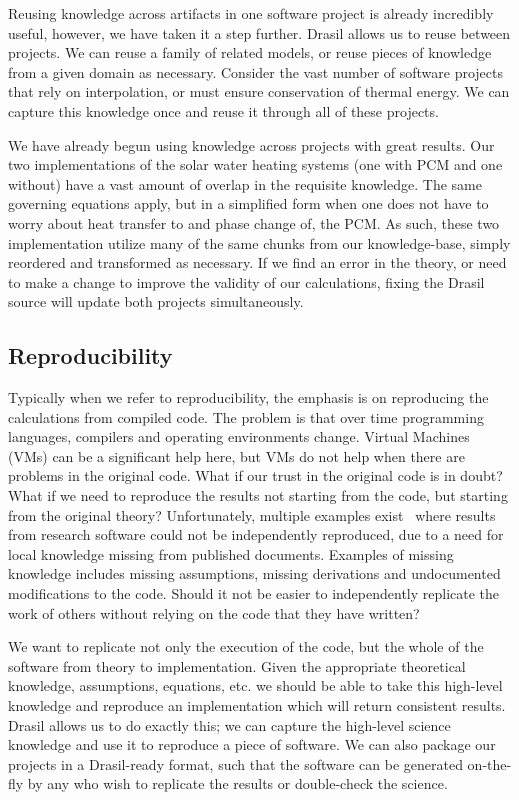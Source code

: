 \documentclass[sigconf]{acmart}
\begin{document}
{Reusing knowledge across artifacts in one software project is already 
incredibly useful, however, we have taken it a step further. Drasil allows us 
to reuse between projects. We can reuse a family of related models, or reuse 
pieces of knowledge from a given domain as necessary. Consider the vast number 
of software projects that rely on interpolation, or must ensure conservation of thermal 
energy. We can capture this knowledge once and reuse it through all of these 
projects.

We have already begun using knowledge across projects with great results. Our
two implementations of the solar water heating systems (one with PCM and one
without) have a vast amount of overlap in the requisite knowledge.  The same
governing equations apply, but in a simplified form when one does not have to
worry about heat transfer to and phase change of, the PCM. As such, these two
implementation utilize many of the same chunks from our knowledge-base, simply
reordered and transformed as necessary. If we find an error in the theory, or
need to make a change to improve the validity of our calculations, fixing the
Drasil source will update both projects simultaneously.

\subsection{Reproducibility}

Typically when we refer to reproducibility, the emphasis is on reproducing the
calculations from compiled code. The problem is that over time programming
languages, compilers and operating environments change.  Virtual Machines (VMs)
can be a significant help here, but VMs do not help when there are problems in
the original code.  What if our trust in the original code is in doubt?  What if
we need to reproduce the results not starting from the code, but starting from
the original theory?  Unfortunately, multiple examples
exist~\cite{CrickAndHall2014, IonescuAndJansson2013} where results from research
software could not be independently reproduced, due to a need for local
knowledge missing from published documents.  Examples of missing knowledge
includes missing assumptions, missing derivations and undocumented modifications
to the code.  Should it not be easier to independently replicate the work of
others without relying on the code that they have written?

We want to replicate not only the execution of the code, but the whole of the 
software from theory to implementation. Given the appropriate theoretical 
knowledge, assumptions, equations, etc. we should be able to take this 
high-level knowledge and reproduce an implementation which will return 
consistent results. Drasil allows us to do exactly this; we can capture the 
high-level science knowledge and use it to reproduce a piece of software. We 
can also package our projects in a Drasil-ready format, such that the software 
can be generated on-the-fly by any who wish to replicate the results or 
double-check the science.

}
\end{document}
